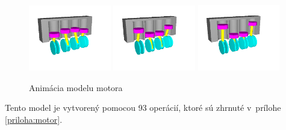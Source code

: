 \begin{figure}[H]
	\includegraphics[trim=40 40 80 40,clip,width=0.32\textwidth]{obrazky-figures/Examples/engine/engine t=7.png}
	\includegraphics[trim=40 40 80 40,clip,width=0.32\textwidth]{obrazky-figures/Examples/engine/engine t=8.png}
	\includegraphics[trim=40 40 80 40,clip,width=0.32\textwidth]{obrazky-figures/Examples/engine/engine t=9.png}
	\caption{Animácia modelu motora}
	\label{fig:motorAnimation}
\end{figure}
Tento model je vytvorený pomocou 93 operácií, ktoré sú zhrnuté v~prílohe \ref{priloha:motor}.









